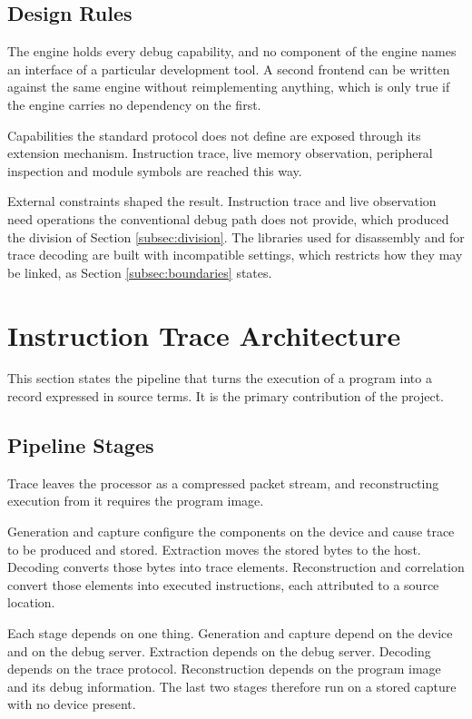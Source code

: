 \subsection{Design Rules}
The engine holds every debug capability, and no component of the engine names an interface of a particular development tool. A second frontend can be written against the same engine without reimplementing anything, which is only true if the engine carries no dependency on the first.

Capabilities the standard protocol does not define are exposed through its extension mechanism. Instruction trace, live memory observation, peripheral inspection and module symbols are reached this way.

External constraints shaped the result. Instruction trace and live observation need operations the conventional debug path does not provide, which produced the division of Section \ref{subsec:division}. The libraries used for disassembly and for trace decoding are built with incompatible settings, which restricts how they may be linked, as Section \ref{subsec:boundaries} states.

\section{Instruction Trace Architecture}
\label{sec:trace_arch}
This section states the pipeline that turns the execution of a program into a record expressed in source terms. It is the primary contribution of the project.

\subsection{Pipeline Stages}
Trace leaves the processor as a compressed packet stream, and reconstructing execution from it requires the program image.

Generation and capture configure the components on the device and cause trace to be produced and stored. Extraction moves the stored bytes to the host. Decoding converts those bytes into trace elements. Reconstruction and correlation convert those elements into executed instructions, each attributed to a source location.

Each stage depends on one thing. Generation and capture depend on the device and on the debug server. Extraction depends on the debug server. Decoding depends on the trace protocol. Reconstruction depends on the program image and its debug information. The last two stages therefore run on a stored capture with no device present.

